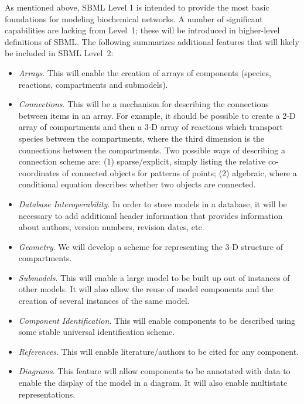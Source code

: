 \documentclass[10pt]{cekarticle}
\begin{document}
As mentioned above, SBML Level 1 is intended to provide the most basic
foundations for modeling biochemical networks.  A number of significant
capabilities are lacking from Level~1; these will be introduced in
higher-level definitions of SBML.  The following summarizes additional
features that will likely be included in SBML Level~2:
\begin{itemize}  
  
\item \emph{Arrays}.  This will enable the creation of arrays of components
  (species, reactions, compartments and submodels).
   
\item \emph{Connections}.  This will be a mechanism for describing the
  connections between items in an array.  For example, it should be
  possible to create a 2-D array of compartments and then a 3-D array of
  reactions which transport species between the compartments, where the
  third dimension is the connections between the compartments.  Two
  possible ways of describing a connection scheme are: (1) sparse/explicit,
  simply listing the relative co-coordinates of connected objects for
  patterns of points; (2) algebraic, where a conditional equation describes
  whether two objects are connected.
  
\item \emph{Database Interoperability}.  In order to store models in a
  database, it will be necessary to add additional header information that
  provides information about authors, version numbers, revision dates, etc.

\item \emph{Geometry}.  We will develop a scheme for representing the 3-D
  structure of compartments.
  
\item \emph{Submodels}.  This will enable a large model to be built up out
  of instances of other models.  It will also allow the reuse of model
  components and the creation of several instances of the same model.
  
\item \emph{Component Identification}.  This will enable components to be
  described using some stable universal identification scheme.
  
\item \emph{References}.  This will enable literature/authors to be cited
  for any component.
  
\item \emph{Diagrams}.  This feature will allow components to be annotated
  with data to enable the display of the model in a diagram.  It will also
  enable multistate representations.

\end{itemize}
\end{document}

